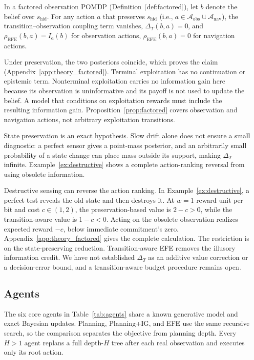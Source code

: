 \documentclass[manuscript, screen, review]{jair}
\begin{document}
\begin{proposition}
\label{prop:factored}
In a factored observation POMDP (Definition~\ref{def:factored}), let $b$ denote the belief over $s_{\mathrm{hid}}$. For any action $a$ that preserves $s_{\mathrm{hid}}$ (i.e., $a \in \mathcal{A}_{\mathrm{obs}} \cup \mathcal{A}_{\mathrm{nav}}$), the transition--observation coupling term vanishes, $\Delta_T(b, a) = 0$, and $\rho_{\mathrm{EFE}}(b, a) = I_a(b)$ for observation actions, $\rho_{\mathrm{EFE}}(b, a) = 0$ for navigation actions.
\end{proposition}

Under preservation, the two posteriors coincide, which proves the claim (Appendix~\ref{app:theory_factored}). Terminal exploitation has no continuation or epistemic term. Nonterminal exploitation carries no information gain here because its observation is uninformative and its payoff is not used to update the belief. A model that conditions on exploitation rewards must include the resulting information gain. Proposition~\ref{prop:factored} covers observation and navigation actions, not arbitrary exploitation transitions.

State preservation is an exact hypothesis. Slow drift alone does not ensure a small diagnostic: a perfect sensor gives a point-mass posterior, and an arbitrarily small probability of a state change can place mass outside its support, making $\Delta_T$ infinite. Example~\ref{ex:destructive} shows a complete action-ranking reversal from using obsolete information.

Destructive sensing can reverse the action ranking. In Example~\ref{ex:destructive}, a perfect test reveals the old state and then destroys it. At $w=1$ reward unit per bit and cost $c\in(1,2)$, the preservation-based value is $2-c>0$, while the transition-aware value is $1-c<0$. Acting on the obsolete observation realizes expected reward $-c$, below immediate commitment's zero. Appendix~\ref{app:theory_factored} gives the complete calculation. The restriction is on the state-preserving reduction. Transition-aware EFE removes the illusory information credit. We have not established $\Delta_T$ as an additive value correction or a decision-error bound, and a transition-aware budget procedure remains open.

\subsection{Agents}
\label{sec:agents}

The six core agents in Table~\ref{tab:agents} share a known generative model and exact Bayesian updates. Planning, Planning+IG, and EFE use the same recursive search, so the comparison separates the objective from planning depth. Every $H>1$ agent replans a full depth-$H$ tree after each real observation and executes only its root action.
\end{document}
